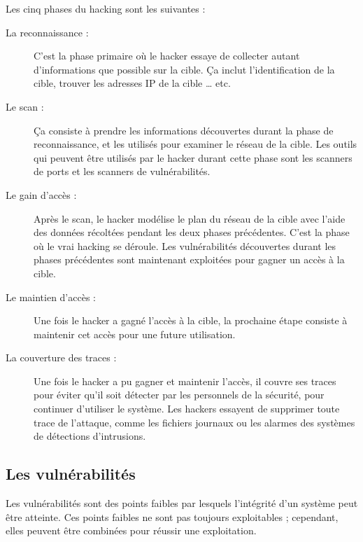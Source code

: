     Les cinq phases du hacking sont les suivantes \cite{phases_of_hacking} : %
    \begin{description}
        \item[La reconnaissance :] C'est la phase primaire où le hacker essaye de collecter autant d'informations que
        possible sur la cible. Ça inclut l'identification de la cible, trouver les adresses IP \cite{reseau}
        de la cible \ldots{} etc. %

        \item[Le scan :] Ça consiste à prendre les informations découvertes durant la phase de reconnaissance, et 
            les utilisés pour examiner le réseau de la cible. Les outils qui peuvent être utilisés par 
            le hacker durant cette phase sont les scanners de ports et les scanners de vulnérabilités. %

        \item[Le gain d'accès :] Après le scan, le hacker modélise le plan du réseau de la cible avec l'aide
            des données récoltées pendant les deux phases précédentes. C'est la 
            phase où le vrai hacking se déroule. Les vulnérabilités découvertes durant les phases précédentes sont 
            maintenant exploitées pour gagner un accès à la cible. %

        \item[Le maintien d'accès :] Une fois le hacker a gagné l'accès à la cible, la prochaine étape consiste à 
            maintenir cet accès pour une future utilisation. %

        \item[La couverture des traces :] Une fois le hacker a pu gagner et maintenir l'accès, il couvre ses traces 
            pour éviter qu'il soit détecter par les personnels de la sécurité, pour continuer d'utiliser le système.
            Les hackers essayent de supprimer toute trace de l'attaque, comme les fichiers journaux ou 
            les alarmes des systèmes de détections d'intrusions. %

    \end{description}

    \subsection{Les vulnérabilités}
    Les vulnérabilités sont des points faibles par lesquels l'intégrité d'un système peut être atteinte. Ces points 
    faibles ne sont pas toujours exploitables ; cependant, elles peuvent être combinées pour 
    réussir une exploitation. %
    

